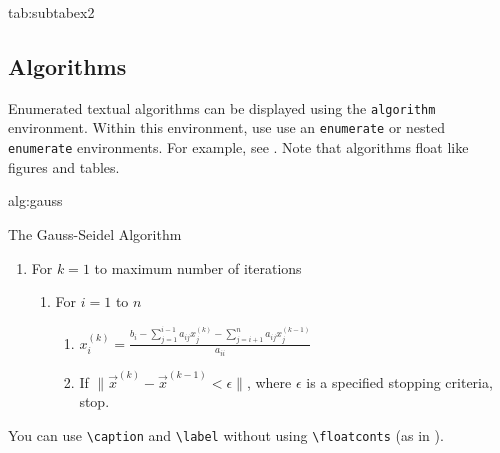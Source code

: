 \documentclass[pmlr]{jmlr}%
\begin{document}
\begin{table}[htbp]
\floatconts
 {tab:subtabex2}
 {\caption{Another Example With Sub-Tables}}
 {%
   \qquad
 }
\end{table}

\subsection{Algorithms}
\label{sec:algorithms}

Enumerated textual algorithms can be displayed using the
\texttt{algorithm} environment. Within this environment, use
use an \texttt{enumerate} or nested \texttt{enumerate} environments.
For example, see . Note that algorithms
float like figures and tables.

\begin{algorithm}[htbp]
\floatconts
{alg:gauss}%
{\caption{The Gauss-Seidel Algorithm}}
{%
\begin{enumerate}
  \item For $k=1$ to maximum number of iterations
    \begin{enumerate}
      \item For $i=1$ to $n$
        \begin{enumerate}
        \item $x_i^{(k)} = 
          \frac{b_i - \sum_{j=1}^{i-1}a_{ij}x_j^{(k)}
          - \sum_{j=i+1}^{n}a_{ij}x_j^{(k-1)}}{a_{ii}}$
        \item If $\|\vec{x}^{(k)}-\vec{x}^{(k-1)} < \epsilon\|$,
          where $\epsilon$ is a specified stopping criteria, stop.
      \end{enumerate}
    \end{enumerate}
\end{enumerate}
}
\end{algorithm}

You can use \verb|\caption| and \verb|\label| without using
\verb|\floatconts| (as in ).
\end{document}

